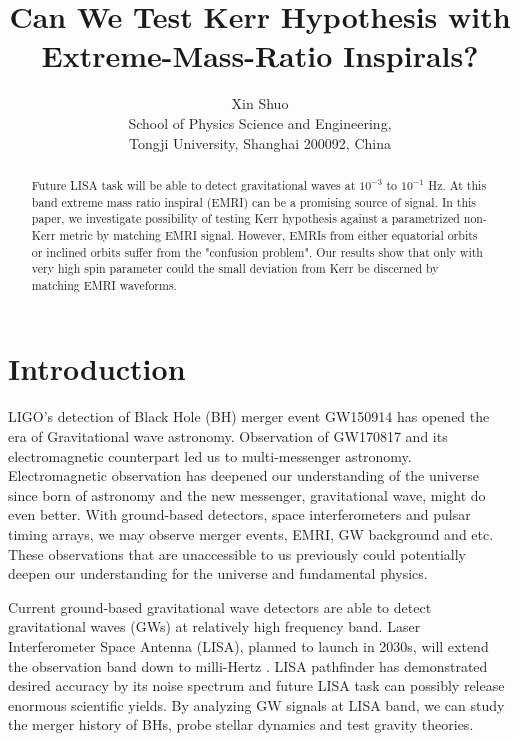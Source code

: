 \documentclass{article}
\begin{document}
\title{Can We Test Kerr Hypothesis with Extreme-Mass-Ratio Inspirals?}
\author{Xin Shuo\\School of Physics Science and Engineering,\\Tongji University, Shanghai 200092, China}
\date{}
\maketitle
\begin{abstract}
	Future LISA task will be able to detect gravitational waves at $10^{-3}$ to $10^{-1}$ Hz. At this band extreme mass ratio inspiral (EMRI) can be a promising source of signal. In this paper, we investigate possibility of testing Kerr hypothesis against a parametrized non-Kerr metric by matching EMRI signal. However, EMRIs from either equatorial orbits or inclined orbits suffer from the "confusion problem". Our results show that only with very high spin parameter could the small deviation from Kerr be discerned by matching EMRI waveforms.
\end{abstract}


\section{Introduction}

LIGO's detection of Black Hole (BH) merger event GW150914 has opened the era of Gravitational wave astronomy\cite{ligo}. Observation of  GW170817 \cite{170817}and its electromagnetic counterpart led us to multi-messenger astronomy\cite{multi}. Electromagnetic observation has deepened our understanding of the universe since born of astronomy and the new messenger, gravitational wave, might do even better. With ground-based detectors\cite{a_ligo}\cite{virgo}, space interferometers\cite{lisa_org} and pulsar timing arrays\cite{PTA}, we may observe merger events, EMRI, GW background and etc. These observations that are unaccessible to us previously could potentially deepen our understanding for the universe and fundamental physics.

Current ground-based gravitational wave detectors are able to detect gravitational waves (GWs) at relatively high frequency band. Laser Interferometer Space Antenna (LISA), planned to launch in 2030s, will extend the observation band down to milli-Hertz \cite{lisa}. LISA pathfinder has demonstrated desired accuracy by its noise spectrum\cite{LPF} and future LISA task can possibly release enormous scientific yields. By analyzing GW signals at LISA band, we can study the merger history of BHs\cite{lisa_mergerhistory}, probe stellar dynamics\cite{sameOmg} and test gravity theories\cite{test_GR}.
\end{document}
